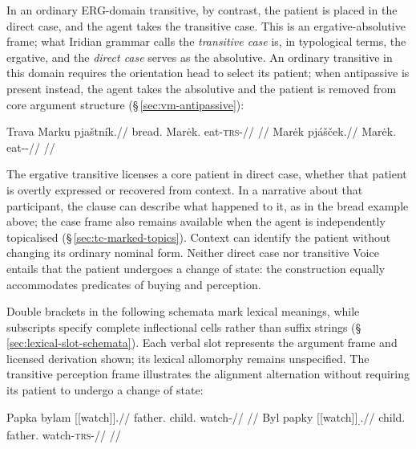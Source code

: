 In an ordinary ERG-domain transitive, by contrast, the patient is
placed in the direct case, and the agent takes the transitive case. This is an
ergative-absolutive frame; what Iridian grammar calls the \emph{transitive case}
is, in typological terms, the ergative, and the \emph{direct case} serves as
the absolutive. An ordinary transitive in this domain requires the orientation head
 to select its patient; when antipassive
 is present instead, the agent takes the absolutive and the patient is
removed from core argument structure (§\,\ref{sec:vm-antipassive}):

\pex
\a
\begingl
\gla Trava Marku pjaštník.//
\glb bread.\Dir{} Marėk.\Trs{} eat-\textsc{trs}-\Pf{}//
\glft {} //
\endgl
\a
\begingl
\gla Marėk pjášček.//
\glb Marėk.\Dir{} eat-\Antip{}-\Pf{}//
\glft {} //
\endgl
\xe

The ergative transitive licenses a core patient in direct case, whether that
patient is overtly expressed or recovered from context. In a narrative about
that participant, the clause can describe what happened to it, as in the
bread example above; the case frame also remains available when the agent is
independently topicalised (§\,\ref{sec:tc-marked-topics}). Context can
identify the patient without changing its ordinary nominal form.
Neither direct case nor transitive Voice entails that the patient undergoes
a change of state: the construction equally accommodates predicates of buying
and perception.

Double brackets in the following schemata mark lexical meanings, while
subscripts specify complete inflectional cells rather than suffix strings
(§\,\ref{sec:lexical-slot-schemata}). Each verbal slot represents the
argument frame and licensed derivation shown; its lexical allomorphy remains
unspecified. The transitive perception frame illustrates the alignment
alternation without requiring its patient to undergo a change of state:

\pex\label{ex:val-slot-perception}
\a
\begingl
\gla Papka bylam \textnormal{[[watch]]}\textsubscript{\Prog{}}.//
\glb father.\Dir{} child.\Ind{} watch-\Prog{}//
\glft {}
//
\endgl
\a
\begingl
\gla Byl papky \textnormal{[[watch]]}\textsubscript{\Trs{}.\Pf{}}.//
\glb child.\Dir{} father.\Trs{} watch-\textsc{trs}-\Pf{}//
\glft {}
//
\endgl
\xe

